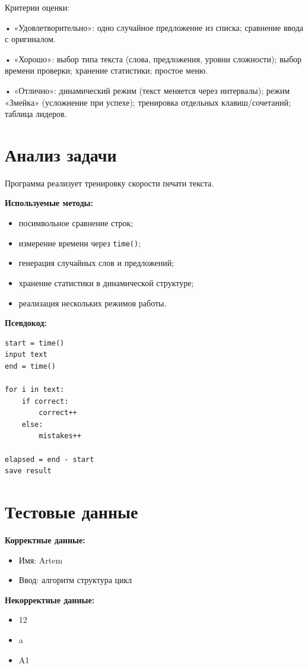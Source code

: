 \documentclass[a4paper,14pt,oneside,openany]{memoir}
\begin{document}
Критерии оценки:

• «Удовлетворительно»: одно случайное предложение из списка; сравнение ввода с
оригиналом.

• «Хорошо»: выбор типа текста (слова, предложения, уровни сложности); выбор
времени проверки; хранение статистики; простое меню.

• «Отлично»: динамический режим (текст меняется через интервалы); режим
«Змейка» (усложнение при успехе); тренировка отдельных клавиш/сочетаний;
таблица лидеров.
\chapter{Анализ задачи}

Программа реализует тренировку скорости печати текста.

\textbf{Используемые методы:}
\begin{itemize}
\item посимвольное сравнение строк;
\item измерение времени через \texttt{time()};
\item генерация случайных слов и предложений;
\item хранение статистики в динамической структуре;
\item реализация нескольких режимов работы.
\end{itemize}

\textbf{Псевдокод:}

\begin{verbatim}
start = time()
input text
end = time()

for i in text:
    if correct:
        correct++
    else:
        mistakes++

elapsed = end - start
save result
\end{verbatim}

\chapter{Тестовые данные}

\textbf{Корректные данные:}
\begin{itemize}
\item Имя: Artem
\item Ввод: алгоритм структура цикл
\end{itemize}

\textbf{Некорректные данные:}
\begin{itemize}
\item 12
\item a
\item A1
\end{itemize}
\end{document}
